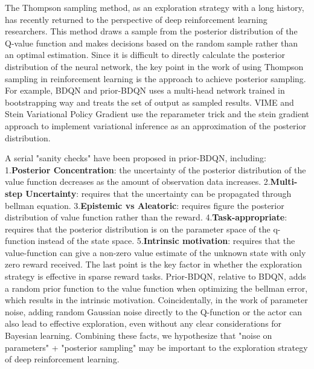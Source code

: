 The Thompson sampling method, as an exploration strategy with a long history, has recently returned to the perspective of deep reinforcement learning researchers. This method draws a sample from the posterior distribution of the Q-value function and makes decisions based on the random sample rather than an optimal estimation. Since it is difficult to directly calculate the posterior distribution of the neural network, the key point in the work of using Thompson sampling in reinforcement learning is the approach to achieve posterior sampling. For example, BDQN \cite{BDQN} and prior-BDQN \cite{osband2018randomized} uses a multi-head network trained in bootstrapping way and treats the set of output as sampled results. VIME \cite{VIME} and Stein Variational Policy Gradient \cite{liu2017stein} use the reparameter trick and the stein gradient approach to implement variational inference as an approximation of the posterior distribution. 

A serial "sanity checks" have been proposed in prior-BDQN, including: 1.\textbf{Posterior Concentration}: the uncertainty of the posterior distribution of the value function decreases as the amount of observation data increases. 2.\textbf{Multi-step Uncertainty}: requires that the uncertainty can be propagated through bellman equation. 3.\textbf{Epistemic vs Aleatoric}: requires figure the posterior distribution of value function rather than the reward. 4.\textbf{Task-appropriate}: requires that the posterior distribution is on the parameter space of the q-function instead of the state space. 5.\textbf{Intrinsic motivation}: requires that the value-function can give a non-zero value estimate of the unknown state with only zero reward received. The last point is the key factor in whether the exploration strategy is effective in sparse reward tasks. Prior-BDQN, relative to BDQN, adds a random prior function to the value function when optimizing the bellman error, which results in the intrinsic motivation. Coincidentally, in the work of parameter noise, adding random Gaussian noise directly to the Q-function or the actor can also lead to effective exploration, even without any clear considerations for Bayesian learning. Combining these facts, we hypothesize that "noise on parameters" + "posterior sampling" may be important to the exploration strategy of deep reinforcement learning.